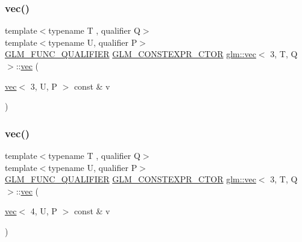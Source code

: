 \mbox{\label{structglm_1_1vec_3_013_00_01_t_00_01_q_01_4_a9f3cdc2f03db0bc50512e16a64cdb4aa}} 
\subsubsection{\texorpdfstring{vec()}{vec()}\hspace{0.1cm}{\footnotesize\ttfamily [22/23]}}
{\footnotesize\ttfamily template$<$typename T , qualifier Q$>$ \\
template$<$typename U, qualifier P$>$ \\
\hyperlink{setup_8hpp_a33fdea6f91c5f834105f7415e2a64407}{G\+L\+M\+\_\+\+F\+U\+N\+C\+\_\+\+Q\+U\+A\+L\+I\+F\+I\+ER} \hyperlink{setup_8hpp_ad34178a09666081abdb573c14d1f4a5a}{G\+L\+M\+\_\+\+C\+O\+N\+S\+T\+E\+X\+P\+R\+\_\+\+C\+T\+OR} \hyperlink{structglm_1_1vec}{glm\+::vec}$<$ 3, T, Q $>$\+::\hyperlink{structglm_1_1vec}{vec} (\begin{DoxyParamCaption}\item[{\hyperlink{structglm_1_1vec}{vec}$<$ 3, U, P $>$ const \&}]{v }\end{DoxyParamCaption})}

\mbox{\label{structglm_1_1vec_3_013_00_01_t_00_01_q_01_4_a71c4b9fad3b06926109f1f8fa74f6064}} 
\subsubsection{\texorpdfstring{vec()}{vec()}\hspace{0.1cm}{\footnotesize\ttfamily [23/23]}}
{\footnotesize\ttfamily template$<$typename T , qualifier Q$>$ \\
template$<$typename U, qualifier P$>$ \\
\hyperlink{setup_8hpp_a33fdea6f91c5f834105f7415e2a64407}{G\+L\+M\+\_\+\+F\+U\+N\+C\+\_\+\+Q\+U\+A\+L\+I\+F\+I\+ER} \hyperlink{setup_8hpp_ad34178a09666081abdb573c14d1f4a5a}{G\+L\+M\+\_\+\+C\+O\+N\+S\+T\+E\+X\+P\+R\+\_\+\+C\+T\+OR} \hyperlink{structglm_1_1vec}{glm\+::vec}$<$ 3, T, Q $>$\+::\hyperlink{structglm_1_1vec}{vec} (\begin{DoxyParamCaption}\item[{\hyperlink{structglm_1_1vec}{vec}$<$ 4, U, P $>$ const \&}]{v }\end{DoxyParamCaption})}




